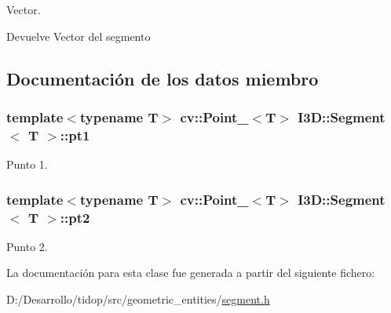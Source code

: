 Vector. 

\begin{DoxyReturn}{Devuelve}
Vector del segmento 
\end{DoxyReturn}


\subsection{Documentación de los datos miembro}
\subsubsection[{\texorpdfstring{pt1}{pt1}}]{\setlength{\rightskip}{0pt plus 5cm}template$<$typename T$>$ cv\+::\+Point\+\_\+$<$T$>$ {\bf I3\+D\+::\+Segment}$<$ T $>$\+::pt1}\hypertarget{class_i3_d_1_1_segment_a5d431900fec31fe43607218ba4c382be}{}\label{class_i3_d_1_1_segment_a5d431900fec31fe43607218ba4c382be}


Punto 1. 

\subsubsection[{\texorpdfstring{pt2}{pt2}}]{\setlength{\rightskip}{0pt plus 5cm}template$<$typename T$>$ cv\+::\+Point\+\_\+$<$T$>$ {\bf I3\+D\+::\+Segment}$<$ T $>$\+::pt2}\hypertarget{class_i3_d_1_1_segment_a15813aa4738a8e5ea4a06ad56fdb0e6d}{}\label{class_i3_d_1_1_segment_a15813aa4738a8e5ea4a06ad56fdb0e6d}


Punto 2. 



La documentación para esta clase fue generada a partir del siguiente fichero\+:\begin{DoxyCompactItemize}
\item 
D\+:/\+Desarrollo/tidop/src/geometric\+\_\+entities/\hyperlink{segment_8h}{segment.\+h}\end{DoxyCompactItemize}
